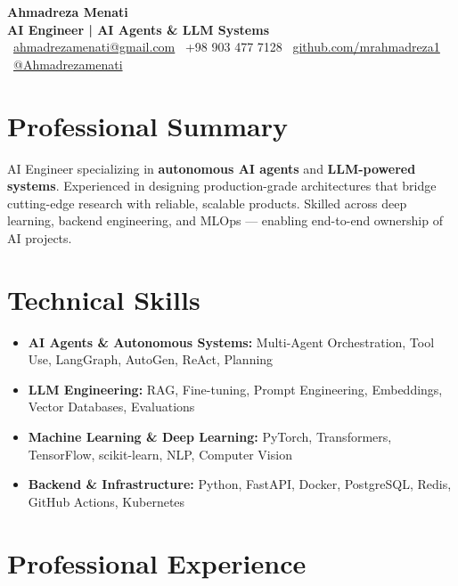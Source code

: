 \documentclass[11pt,a4paper]{article}
\begin{document}
\begin{center}
    {\Huge\bfseries\color{darktext} Ahmadreza Menati}\\[0.4em]
    {\large\color{primary}\textbf{AI Engineer | AI Agents \& LLM Systems}}\\[0.6em]
    \small
    \faEnvelope\ \href{mailto:ahmadrezamenati@gmail.com}{ahmadrezamenati@gmail.com} \quad
    \faPhone\ +98 903 477 7128 \quad
    \faGithub\ \href{https://github.com/mrahmadreza1}{github.com/mrahmadreza1} \quad
    \faTelegram\ \href{https://t.me/Ahmadrezamenati}{@Ahmadrezamenati}
\end{center}

\vspace{0.5em}

\section*{Professional Summary}
AI Engineer specializing in \textbf{autonomous AI agents} and \textbf{LLM-powered systems}. Experienced in designing production-grade architectures that bridge cutting-edge research with reliable, scalable products. Skilled across deep learning, backend engineering, and MLOps — enabling end-to-end ownership of AI projects.

\section*{Technical Skills}
\begin{itemize}[leftmargin=*, itemsep=2pt]
    \item \textbf{AI Agents \& Autonomous Systems:} Multi-Agent Orchestration, Tool Use, LangGraph, AutoGen, ReAct, Planning
    \item \textbf{LLM Engineering:} RAG, Fine-tuning, Prompt Engineering, Embeddings, Vector Databases, Evaluations
    \item \textbf{Machine Learning \& Deep Learning:} PyTorch, Transformers, TensorFlow, scikit-learn, NLP, Computer Vision
    \item \textbf{Backend \& Infrastructure:} Python, FastAPI, Docker, PostgreSQL, Redis, GitHub Actions, Kubernetes
\end{itemize}

\section*{Professional Experience}
\end{document}
